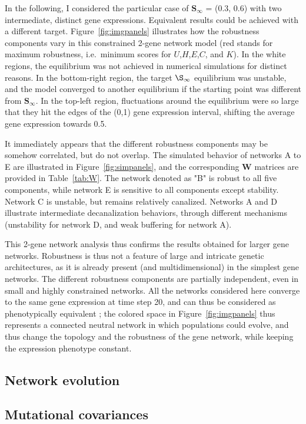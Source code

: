 \documentclass{article}
\begin{document}
In the following, I considered the particular case of $\bm S_\infty$ = (0.3, 0.6) with two intermediate, distinct gene expressions. Equivalent results could be achieved with a different target. Figure~\ref{fig:imgpanels} illustrates how the robustness components vary in this constrained 2-gene network model (red stands for maximum robustness, i.e.\ minimum scores for $U$,$H$,$E$,$C$, and $K$). In the white regions, the equilibrium was not achieved in numerical simulations for distinct reasons. In the bottom-right region, the target $\S_\infty$ equilibrium was unstable, and the model converged to another equilibrium if the starting point was different from $\bm S_\infty$. In the top-left region, fluctuations around the equilibrium were so large that they hit the edges of the (0,1) gene expression interval, shifting the average gene expression towards 0.5. 

It immediately appears that the different robustness components may be somehow correlated, but do not overlap. The simulated behavior of networks A to E are illustrated in Figure~\ref{fig:simpanels}, and the corresponding $\bm W$ matrices are provided in Table~\ref{tab:W}. The network denoted as "B" is robust to all five components, while network E is sensitive to all components except stability. Network C is unstable, but remains relatively canalized. Networks A and D illustrate intermediate decanalization behaviors, through different mechanisms (unstability for network D, and weak buffering for network A). 

This 2-gene network analysis thus confirms the results obtained for larger gene networks. Robustness is thus not a feature of large and intricate genetic architectures, as it is already present (and multidimensional) in the simplest gene networks. The different robustness components are partially independent, even in small and highly constrained networks. All the networks considered here converge to the same gene expression at time step 20, and can thus be considered as phenotypically equivalent ; the colored space in Figure~\ref{fig:imgpanels} thus represents a connected neutral network in which populations could evolve, and thus change the topology and the robustness of the gene network, while keeping the expression phenotype constant. 

\subsection{Network evolution}

\subsection{Mutational covariances}
\end{document}
